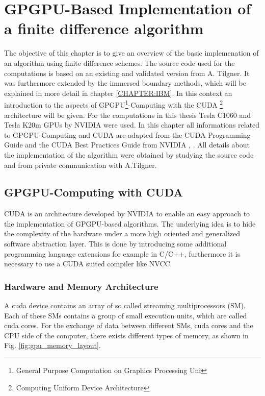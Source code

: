 \chapter[ GPGPU-Based Implementation of a finite difference algorithm]{GPGPU-Based Implementation of \\ a finite difference algorithm}

\label{CHAPTER:CUDA}

The objective of this chapter is to give an overview of the basic implemenation of an algorithm using finite difference schemes.
The source code used for the computations is based on an existing and validated version from A. Tilgner.
It was furthermore extended by the immersed boundary methods, which will be explained in more detail in chapter \ref{CHAPTER:IBM}.
In this context an introduction to the aspects of GPGPU\footnote{General Purpose Computation on Graphics Processing Uni}-Computing
with the CUDA \footnote{Computing Uniform Device Architecture} architecture will be given.
For the computations in this thesis Tesla C1060 and Tesla K20m GPUs by NVIDIA were used.%
In this chapter all informations related to GPGPU-Computing and CUDA are adapted from the CUDA Programming Guide and the CUDA Best Practices Guide from NVIDIA
\citep{CUDAPG}, \citep{CUDABP}. All details about the implementation of the algorithm were obtained by studying the source code
and from private communication with A.Tilgner.

\section{GPGPU-Computing with CUDA}

CUDA is an architecture developed by NVIDIA to enable an easy approach to the implementation of GPGPU-based algorithms.
The underlying idea is to hide the complexity of the hardware under a more high oriented and generalized software abstraction layer.
This is done by introducing some additional programming language extensions for example in C/C++,
furthermore it is necessary to use a CUDA suited compiler like NVCC.

\subsection{Hardware and Memory Architecture}

A cuda device contains an array of so called streaming multiprocessors (SM).
Each of these SMs contains a group of small execution units, which are called cuda cores.
For the exchange of data between different SMs, cuda cores and the CPU side of the computer, there exists different
types of memory, as shown  in Fig.  \ref{fig:gpu_memory_layout}.
\newpage

